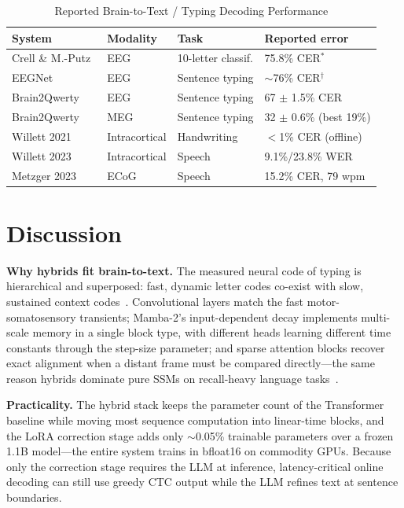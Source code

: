 \documentclass[conference]{IEEEtran}
\begin{document}
\begin{table}[t]
\centering
\caption{Reported Brain-to-Text / Typing Decoding Performance}
\label{tab:results}
\scriptsize
\begin{tabular}{@{}llll@{}}
\toprule
\textbf{System} & \textbf{Modality} & \textbf{Task} & \textbf{Reported error} \\
\midrule
Crell \& M.-Putz~\cite{crell2024} & EEG & 10-letter classif. & 75.8\% CER$^*$ \\
EEGNet~\cite{lawhern2018eegnet,levy2025} & EEG & Sentence typing & $\sim$76\% CER$^\dagger$ \\
Brain2Qwerty~\cite{levy2025} & EEG & Sentence typing & 67 $\pm$ 1.5\% CER \\
Brain2Qwerty~\cite{levy2025} & MEG & Sentence typing & 32 $\pm$ 0.6\% (best 19\%) \\
Willett 2021~\cite{willett2021} & Intracortical & Handwriting & $<$1\% CER (offline) \\
Willett 2023~\cite{willett2023} & Intracortical & Speech & 9.1\%/23.8\% WER \\
Metzger 2023~\cite{metzger2023} & ECoG & Speech & 15.2\% CER, 79 wpm \\
\bottomrule
\end{tabular}
\end{table}

\section{Discussion}
\textbf{Why hybrids fit brain-to-text.} The measured neural code of typing
is hierarchical and superposed: fast, dynamic letter codes co-exist with
slow, sustained context codes~\cite{zhang2025hierarchy}. Convolutional
layers match the fast motor-somatosensory transients; Mamba-2's
input-dependent decay implements multi-scale memory in a single block type,
with different heads learning different time constants through the step-size
parameter; and sparse attention blocks recover exact alignment when a
distant frame must be compared directly---the same reason hybrids dominate
pure SSMs on recall-heavy language
tasks~\cite{dong2024hymba,park2024mambaformer}.

\textbf{Practicality.} The hybrid stack keeps the parameter count of the
Transformer baseline while moving most sequence computation into
linear-time blocks, and the LoRA correction stage adds only $\sim$0.05\%
trainable parameters over a frozen 1.1B model---the entire system trains in
bfloat16 on commodity GPUs. Because only the correction stage requires the
LLM at inference, latency-critical online decoding can still use greedy CTC
output while the LLM refines text at sentence boundaries.
\end{document}

